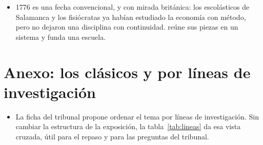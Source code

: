 \documentclass[11pt]{article}
\begin{document}
\begin{itemize}
\item 1776 es una fecha convencional, y con mirada británica: los escolásticos de Salamanca y los fisiócratas ya habían estudiado la economía con método, pero no dejaron una disciplina con continuidad.  reúne sus piezas en un sistema y funda una escuela.
\end{itemize}

\section{Anexo: los clásicos y  por líneas de investigación}\label{anexo:lineas}

\begin{itemize}
\item La ficha del tribunal propone ordenar el tema por líneas de investigación. Sin cambiar la estructura de la exposición, la tabla~\ref{tab:lineas} da esa vista cruzada, útil para el repaso y para las preguntas del tribunal.
\end{itemize}
\end{document}
